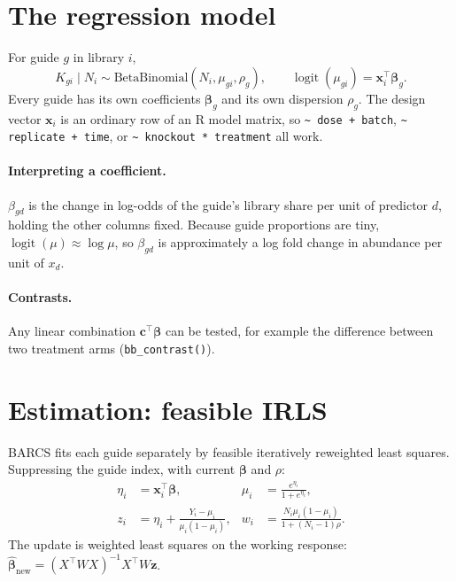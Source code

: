 \documentclass[11pt]{article}
\newcommand{\logit}{\operatorname{logit}}
\begin{document}
\section{The regression model}

For guide $g$ in library $i$,
\begin{equation}
K_{gi}\mid N_i\sim\mathrm{BetaBinomial}(N_i,\mu_{gi},\rho_g),\qquad
\logit(\mu_{gi})=\mathbf{x}_i^\top\boldsymbol\beta_g .
\label{eq:model}
\end{equation}
Every guide has its own coefficients $\boldsymbol\beta_g$ and its own
dispersion $\rho_g$.  The design vector $\mathbf{x}_i$ is an ordinary row of
an R model matrix, so \texttt{\textasciitilde{} dose + batch},
\texttt{\textasciitilde{} replicate + time}, or
\texttt{\textasciitilde{} knockout * treatment} all work.

\paragraph{Interpreting a coefficient.}
$\beta_{gd}$ is the change in log-odds of the guide's library share per unit
of predictor $d$, holding the other columns fixed.  Because guide proportions
are tiny, $\logit(\mu)\approx\log\mu$, so $\beta_{gd}$ is approximately a log
fold change in abundance per unit of $x_d$.

\paragraph{Contrasts.}
Any linear combination $\mathbf{c}^\top\boldsymbol\beta$ can be tested, for
example the difference between two treatment arms
(\texttt{bb\_contrast()}).

\section{Estimation: feasible IRLS}

BARCS fits each guide separately by feasible iteratively reweighted least
squares.  Suppressing the guide index, with current $\boldsymbol\beta$ and
$\rho$:
\begin{align}
\eta_i&=\mathbf{x}_i^\top\boldsymbol\beta, &
\mu_i&=\frac{e^{\eta_i}}{1+e^{\eta_i}},\\
z_i&=\eta_i+\frac{Y_i-\mu_i}{\mu_i(1-\mu_i)}, &
w_i&=\frac{N_i\mu_i(1-\mu_i)}{1+(N_i-1)\rho}.
\end{align}
The update is weighted least squares on the working response:
$\widehat{\boldsymbol\beta}_{\text{new}}=(X^\top WX)^{-1}X^\top W\mathbf{z}$.
\end{document}
